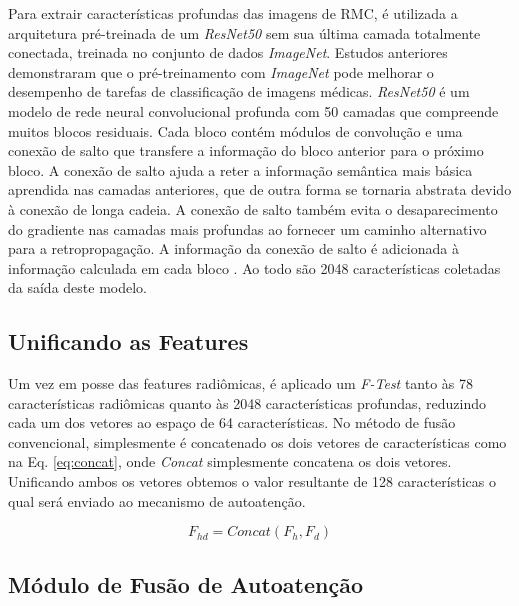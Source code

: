 Para extrair características profundas das imagens de \gls{RMC}, é utilizada a arquitetura pré-treinada de um \textit{ResNet50} sem sua última camada totalmente conectada, treinada no conjunto de dados \textit{ImageNet}. Estudos anteriores demonstraram que o pré-treinamento com \textit{ImageNet} pode melhorar o desempenho de tarefas de classificação de imagens médicas. \textit{ResNet50} é um modelo de rede neural convolucional profunda com 50 camadas que compreende muitos blocos residuais. Cada bloco contém módulos de convolução e uma conexão de salto que transfere a informação do bloco anterior para o próximo bloco. A conexão de salto ajuda a reter a informação semântica mais básica aprendida nas camadas anteriores, que de outra forma se tornaria abstrata devido à conexão de longa cadeia. A conexão de salto também evita o desaparecimento do gradiente nas camadas mais profundas ao fornecer um caminho alternativo para a retropropagação. A informação da conexão de salto é adicionada à informação calculada em cada bloco \cite{aiSelfAttentionBasedFusion2023}. Ao todo são 2048 características coletadas da saída deste modelo.

\subsection{Unificando as Features}
\label{subsec:cap4_unificando_features}

Um vez em posse das features radiômicas, é aplicado um \textit{F-Test} tanto às 78 características radiômicas quanto às 2048 características profundas, reduzindo cada um dos vetores ao espaço de 64 características. No método de fusão convencional, simplesmente é concatenado os dois vetores de características como na Eq. \ref{eq:concat}, onde \textit{Concat} simplesmente concatena os dois vetores. Unificando ambos os vetores obtemos o valor resultante de 128 características o qual será enviado ao mecanismo de autoatenção.

\begin{equation}
F_{hd} = \textit{Concat}(F_h, F_d)
\label{eq:concat}
\end{equation}

\subsection{Módulo de Fusão de Autoatenção}
\label{subsec:cap4_mod_self_attention}

